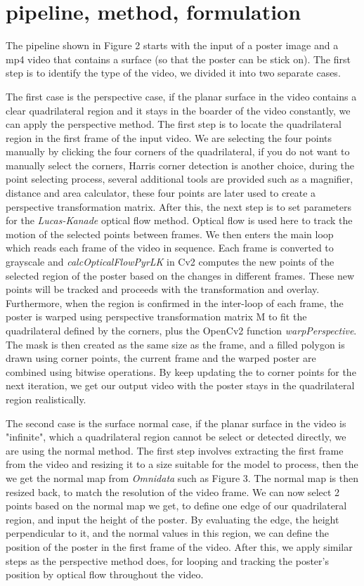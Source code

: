 \documentclass[sigconf]{acmart}
\begin{document}
\section{pipeline, method, formulation}

The pipeline shown in Figure 2 starts with the input of a poster image and a mp4 video that contains a surface (so that the poster can be stick on). The first step is to identify the type of the video, we divided it into two separate cases. 

The first case is the perspective case, if the planar surface in the video contains a clear quadrilateral region and it stays in the boarder of the video constantly, we can apply the perspective method. The first step is to locate the quadrilateral region in the first frame of the input video. We are selecting the four points manually by clicking the four corners of the quadrilateral, if you do not want to manually select the corners, Harris corner detection is another choice, during the point selecting process, several additional tools are provided such as a magnifier, distance and area calculator, these four points are later used to create a perspective transformation matrix. After this, the next step is to set parameters for the \textit{Lucas-Kanade} optical flow method. Optical flow is used here to track the motion of the selected points between frames. We then enters the main loop which reads each frame of the video in sequence. Each frame is converted to grayscale and \textit{calcOpticalFlowPyrLK} in Cv2 computes the new points of the selected region of the poster based on the changes in different frames. These new points will be tracked and proceeds with the transformation and overlay. Furthermore, when the region is confirmed in the inter-loop of each frame, the poster is warped using perspective transformation matrix M to fit the quadrilateral defined by the corners, plus the OpenCv2 function \textit{warpPerspective}. The mask is then created as the same size as the frame, and a filled polygon is drawn using corner points, the current frame and the warped poster are combined using bitwise operations. By keep updating the to corner points for the next iteration, we get our output video with the poster stays in the quadrilateral region realistically.

The second case is the surface normal case, if the planar surface in the video is "infinite", which a quadrilateral region cannot be select or detected directly, we are using the normal method. The first step involves extracting the first frame from the video and resizing it to a size suitable for the model to process, then the we get the normal map from \textit{Omnidata} such as Figure 3. The normal map is then resized back, to match the resolution of the video frame. We can now select 2 points based on the normal map we get, to define one edge of our quadrilateral region, and input the height of the poster. By evaluating the edge, the height perpendicular to it, and the normal values in this region, we can define the position of the poster in the first frame of the video. After this, we apply similar steps as the perspective method does, for looping and tracking the poster's position by optical flow throughout the video.
\end{document}
